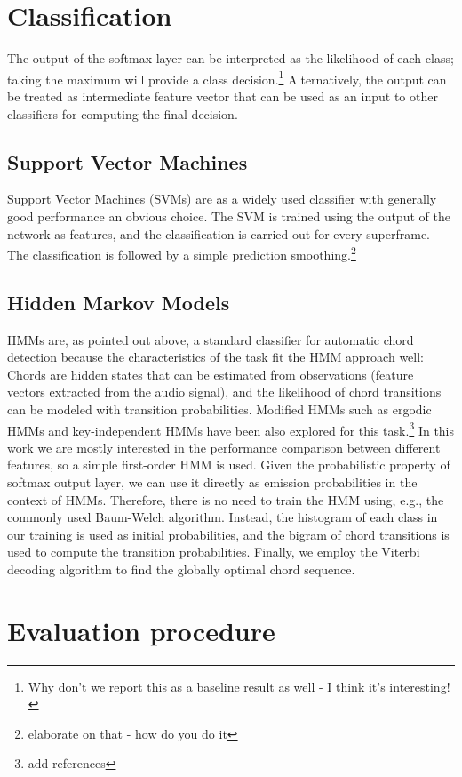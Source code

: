 \documentclass{article}
\begin{document}
\section{Classification}\label{sec:class}
The output of the softmax layer can be interpreted as the likelihood of each class; taking the maximum will provide a class decision.\footnote{Why don't we report this as a baseline result as well - I think it's interesting!} Alternatively, the output can be treated as intermediate feature vector that can be used as an input to other classifiers for computing the final decision. 
\subsection{Support Vector Machines}
Support Vector Machines (SVMs) are as a widely used classifier with generally good performance an obvious choice. The SVM is trained using the output of the network as features, and the classification is carried out for every superframe. The classification is followed by a simple prediction smoothing.\footnote{elaborate on that - how do you do it} 
\subsection{Hidden Markov Models}
HMMs are, as pointed out above, a standard classifier for automatic chord detection because the characteristics of the task fit the HMM approach well: Chords are hidden states that can be estimated from observations (feature vectors extracted from the audio signal), and the likelihood of chord transitions can be modeled with transition probabilities. 
Modified HMMs such as ergodic HMMs and key-independent HMMs have been also explored for this task.\footnote{add references} In this work we are mostly interested in the performance comparison between different features, so a simple first-order HMM is used. 
Given the probabilistic property of softmax output layer, we can use it directly as emission probabilities in the context of HMMs. Therefore, there is no need to train the HMM using, e.g., the commonly used Baum-Welch algorithm. Instead, the histogram of each class in our training is used as initial probabilities, and the bigram of chord transitions is used to compute the transition probabilities. Finally, we employ the Viterbi decoding algorithm to find the globally optimal chord sequence. 

\section{Evaluation procedure}
\end{document}
